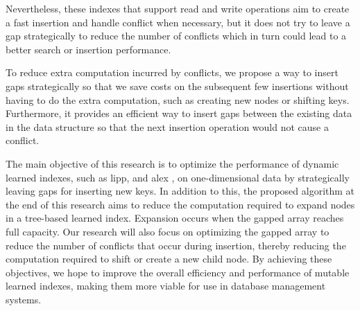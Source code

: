 Nevertheless, these indexes that support read and write operations aim to create a fast insertion and handle conflict when necessary, but it does not try to leave a gap strategically to reduce the number of conflicts which in turn could lead to a better search or insertion performance\cite{ALEX,fittingtree,PGM,LIPP}.

To reduce extra computation incurred by conflicts, we propose a way to insert gaps strategically so that we save costs on the subsequent few insertions without having to do the extra computation, such as creating new nodes or shifting keys. Furthermore, it provides an efficient way to insert gaps between the existing data in the data structure so that the next insertion operation would not cause a conflict. 

The main objective of this research is to optimize the performance of dynamic learned indexes, such as  \acrshort{lipp}, and \acrshort{alex} , on one-dimensional data by strategically leaving gaps for inserting new keys. In addition to this, the proposed algorithm at the end of this research aims to reduce the computation required to expand nodes in a tree-based learned index. Expansion occurs when the gapped array reaches full capacity. Our research will also focus on optimizing the gapped array to reduce the number of conflicts that occur during insertion, thereby reducing the computation required to shift or create a new child node. By achieving these objectives, we hope to improve the overall efficiency and performance of mutable learned indexes, making them more viable for use in database management systems.
